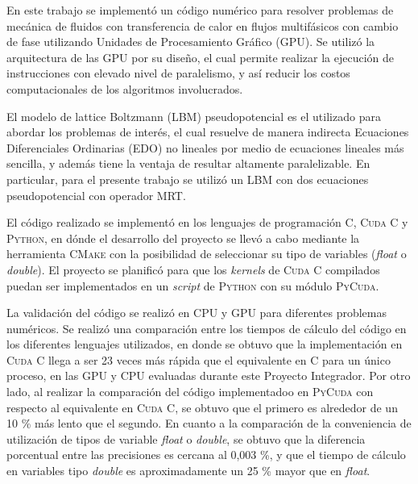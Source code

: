 \begin{resumen}%

En este trabajo se implementó un código numérico para resolver problemas de mecánica de fluidos con transferencia de calor en flujos multifásicos con cambio de fase utilizando Unidades de Procesamiento Gráfico (GPU). Se utilizó la arquitectura de las GPU por su diseño, el cual permite realizar la ejecución de instrucciones con elevado nivel de paralelismo, y así reducir los costos computacionales de los algoritmos involucrados.

El modelo de lattice Boltzmann (LBM) pseudopotencial es el utilizado para abordar los problemas de interés, el cual resuelve de manera indirecta Ecuaciones Diferenciales Ordinarias (EDO) no lineales por medio de ecuaciones lineales más sencilla, y además tiene la ventaja de resultar altamente paralelizable. En particular, para el presente trabajo se utilizó un LBM con dos ecuaciones pseudopotencial con operador MRT.

El código realizado se implementó en los lenguajes de programación \textsc{C}, \textsc{Cuda C} y \textsc{Python}, en dónde el desarrollo del proyecto se llevó a cabo mediante la herramienta \textsc{CMake} con la posibilidad de seleccionar su tipo de variables (\textit{float} o \textit{double}). El proyecto se planificó para que los \textit{kernels} de \textsc{Cuda C} compilados puedan ser implementados en un \textit{script} de \textsc{Python} con su módulo \textsc{PyCuda}.

La validación del código se realizó en CPU y GPU para diferentes problemas numéricos. Se realizó una comparación entre los tiempos de cálculo del código en los diferentes lenguajes utilizados, en donde se obtuvo que la implementación en \textsc{Cuda C} llega a ser 23 veces más rápida que el equivalente en \textsc{C} para un único proceso, en las GPU y CPU evaluadas durante este Proyecto Integrador. Por otro lado, al realizar la comparación del código implementadoo en \textsc{PyCuda} con respecto al equivalente en \textsc{Cuda C}, se obtuvo que el primero es alrededor de un 10 \% más lento que el segundo. En cuanto a la comparación de la conveniencia de utilización de tipos de variable \textit{float} o \textit{double}, se obtuvo que la diferencia porcentual entre las  precisiones es cercana al 0,003 \%, y que el tiempo de cálculo en variables tipo \textit{double} es aproximadamente un 25 \% mayor que en \textit{float}.



\end{resumen}

